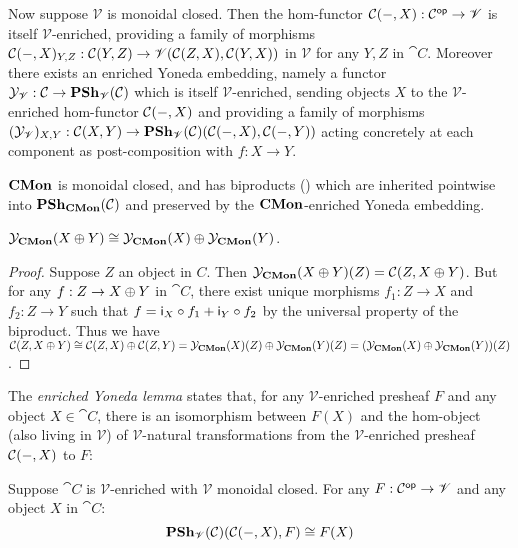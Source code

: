 \noindent Now suppose $\mathscr{V}$ is monoidal closed. Then the hom-functor ${\mathcal{C}}(-,X): \mathcal{C}^{\mathsf{op}}
\to \mathscr{V}$ is itself $\mathscr{V}$-enriched, providing a family of morphisms ${\mathcal{C}}(-,X)_{Y,Z}:
{\mathcal{C}}(Y,Z) \to {\mathscr{V}}({\mathcal{C}}(Z,X),{\mathcal{C}}(Y,X))$ in $\mathscr{V}$ for any
$Y, Z$ in $\cat{C}$. Moreover there exists an enriched Yoneda embedding, namely a functor
$\mathcal{Y}_{\mathscr{V}}: \mathcal{C} \to \mathbf{PSh}_{\mathscr{V}}(\mathcal{C})$ which is itself $\mathscr{V}$-enriched,
sending objects $X$ to the $\mathscr{V}$-enriched hom-functor ${\mathcal{C}}(-,X)$ and providing a family of
morphisms $(\mathcal{Y}_{\mathscr{V}})_{X,Y}: {\mathcal{C}}(X,Y) \to
{\mathbf{PSh}_{\mathscr{V}}(\mathcal{C})}({\mathcal{C}}(-,X),{\mathcal{C}}(-,Y))$ acting concretely at each
component as post-composition with $f: X \to Y$.

 $\mathbf{CMon}$ is monoidal closed, and has
biproducts () which are inherited pointwise into
$\mathbf{PSh}_{\mathbf{CMon}}(\mathcal{C})$ and preserved by the $\mathbf{CMon}$-enriched Yoneda embedding.

\begin{proposition}
$\mathcal{Y}_{\mathbf{CMon}}(X \oplus Y) \cong \mathcal{Y}_{\mathbf{CMon}}(X) \oplus \mathcal{Y}_{\mathbf{CMon}}(Y)$.
\end{proposition}

\begin{proof}
Suppose $Z$ an object in $C$. Then $\mathcal{Y}_{\mathbf{CMon}}(X \oplus Y)(Z) = {\mathcal{C}}(Z,X \oplus Y)$. But for
any $f: Z \to X \oplus Y$ in $\cat{C}$, there exist unique morphisms $f_1: Z \to X$ and $f_2: Z \to Y$ such
that $f = \mathsf{i}_X \circ f_1 + \mathsf{i}_Y \circ f_2$ by the universal property of the biproduct. Thus we have
${\mathcal{C}}(Z,X \oplus Y) \cong {\mathcal{C}}(Z,X) \oplus {\mathcal{C}}(Z,Y) = \mathcal{Y}_{\mathbf{CMon}}(X)(Z)
\oplus \mathcal{Y}_{\mathbf{CMon}}(Y)(Z) = (\mathcal{Y}_{\mathbf{CMon}}(X) \oplus \mathcal{Y}_{\mathbf{CMon}}(Y))(Z)$.
\end{proof}

The \emph{enriched Yoneda lemma} states that, for any $\mathscr{V}$-enriched presheaf $F$ and any object $X
\in \cat{C}$, there is an isomorphism between $F(X)$ and the hom-object (also living in $\mathscr{V}$) of
$\mathscr{V}$-natural transformations from the $\mathscr{V}$-enriched presheaf ${\mathcal{C}}(-,X)$ to $F$:

\begin{lemma}
Suppose $\cat{C}$ is $\mathscr{V}$-enriched with $\mathscr{V}$ monoidal closed. For any $F: \mathcal{C}^{\mathsf{op}} \to
\mathscr{V}$ and any object $X$ in $\cat{C}$:
\[{\mathbf{PSh}_{\mathscr{V}}{(\mathcal{C})}}({\mathcal{C}}(-,X),F) \cong F(X)\]
\end{lemma}


